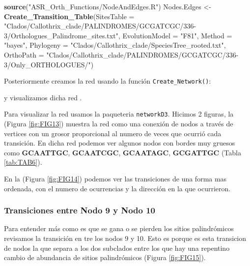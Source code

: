 \documentclass[
]{book}
\newenvironment{Shaded}{\begin{snugshade}}{\end{snugshade}}
\newcommand{\AttributeTok}[1]{\textcolor[rgb]{0.13,0.29,0.53}{#1}}
\newcommand{\FunctionTok}[1]{\textcolor[rgb]{0.13,0.29,0.53}{\textbf{#1}}}
\newcommand{\NormalTok}[1]{#1}
\newcommand{\OtherTok}[1]{\textcolor[rgb]{0.56,0.35,0.01}{#1}}
\newcommand{\StringTok}[1]{\textcolor[rgb]{0.31,0.60,0.02}{#1}}
\begin{document}
\begin{Shaded}
\begin{Highlighting}[]
\FunctionTok{source}\NormalTok{(}\StringTok{"ASR\_Orth\_Functions/NodeAndEdges.R"}\NormalTok{)}
\NormalTok{Nodes.Edges }\OtherTok{\textless{}{-}} \FunctionTok{Create\_Transition\_Table}\NormalTok{(}\AttributeTok{SitesTable =} \StringTok{"Clados/Callothrix\_clade/PALINDROMES/GCGATCGC/336{-}3/Orthologues\_Palindrome\_sites.txt"}\NormalTok{,}
                                \AttributeTok{EvolutionModel =} \StringTok{"F81"}\NormalTok{,}
                                \AttributeTok{Method =} \StringTok{"bayes"}\NormalTok{,}
                                \AttributeTok{Phylogeny =} \StringTok{"Clados/Callothrix\_clade/SpeciesTree\_rooted.txt"}\NormalTok{,}
                                \AttributeTok{OrthoPath =} \StringTok{"Clados/Callothrix\_clade/PALINDROMES/GCGATCGC/336{-}3/Only\_ORTHOLOGUES/"}\NormalTok{)}
\end{Highlighting}
\end{Shaded}

Posteriormente creamos la red usando la función \texttt{Create\_Network()}:

y visualizamos dicha red .

Para visualizar la red usamos la paqueteria \texttt{networkD3}. Hicimos 2 figuras, la (Figura \ref{fig:FIG13}) muestra la red como una conexión de nodos a través de vertices con un grosor proporcional al numero de veces que ocurrió cada transición. En dicha red podemos ver algunos nodos con bordes muy gruesos como \textbf{GCAATTGC}, \textbf{GCAATCGC}, \textbf{GCAATAGC}, \textbf{GCGATTGC} (Tabla \ref{tab:TAB6}).

En la (Figura \ref{fig:FIG14}) podemos ver las transiciones de una forma mas ordenada, con el numero de ocurrencias y la dirección en la que ocurrieron.

\hypertarget{transiciones-entre-nodo-9-y-nodo-10}{%
\subsubsection{Transiciones entre Nodo 9 y Nodo 10}\label{transiciones-entre-nodo-9-y-nodo-10}}

Para entender más como es que se gana o se pierden los sitios palindrómicos revisamos la transición en tre los nodos 9 y 10. Esto es porque es esta transicion de nodos la que separa a los dos subclados entre los que hay una repentino cambio de abundancia de sitios palindrómicos (Figura \ref{fig:FIG15}).
\end{document}
